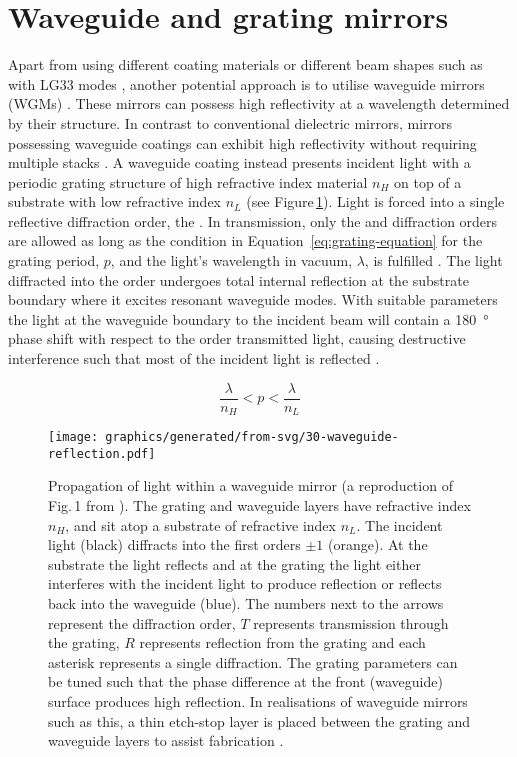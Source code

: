 \section{Waveguide and grating mirrors}
Apart from using different coating materials \cite{Granata2013, Cole2013} or different beam shapes \cite{Mours2006, DAmbrosio2004, Bondarescu2006} such as with LG33 modes \cite{Sorazu2013}, another potential approach is to utilise waveguide mirrors (\glspl{WGM}) \cite{Brueckner2008, Brueckner2009, Brueckner2010, Friedrich2011}. These mirrors can possess high reflectivity at a wavelength determined by their structure. In contrast to conventional dielectric mirrors, mirrors possessing waveguide coatings can exhibit high reflectivity without requiring multiple stacks \cite{Bunkowski2006}. A waveguide coating instead presents incident light with a periodic grating structure of high refractive index material $n_H$ on top of a substrate with low refractive index $n_L$ (see Figure\,\ref{fig:waveguide-reflection}). Light is forced into a single reflective diffraction order, the . In transmission, only the  and  diffraction orders are allowed as long as the condition in Equation~\ref{eq:grating-equation} for the grating period, $p$, and the light's wavelength in vacuum, $\lambda$, is fulfilled \cite{Brueckner2008}. The light diffracted into the  order undergoes total internal reflection at the substrate boundary where it excites resonant waveguide modes. With suitable parameters the light at the waveguide boundary to the incident beam will contain a \SI{180}{\degree} phase shift with respect to the  order transmitted light, causing destructive interference such that most of the incident light is reflected \cite{Sharon1997}.

\begin{equation}
  \frac{\lambda}{n_{H}} < p < \frac{\lambda}{n_{L}}
  \label{eq:grating-equation}
\end{equation}

\begin{figure}
  \centering
  \texttt{[image: graphics/generated/from-svg/30-waveguide-reflection.pdf]}
  \caption[Propagation of light within a waveguide mirror]{\label{fig:waveguide-reflection}Propagation of light within a waveguide mirror (a reproduction of Fig.\,1 from \cite{Brown2013}). The grating and waveguide layers have refractive index $n_H$, and sit atop a substrate of refractive index $n_L$. The incident light (black) diffracts into the first orders $\pm 1$ (orange). At the substrate the light reflects and at the grating the light either interferes with the incident light to produce reflection or reflects back into the waveguide (blue). The numbers next to the arrows represent the diffraction order, $T$ represents transmission through the grating, $R$ represents reflection from the grating and each asterisk represents a single diffraction. The grating parameters can be tuned such that the phase difference at the front (waveguide) surface produces high reflection. In realisations of waveguide mirrors such as this, a thin etch-stop layer is placed between the grating and waveguide layers to assist fabrication \cite{Friedrich2011}.}
\end{figure}

